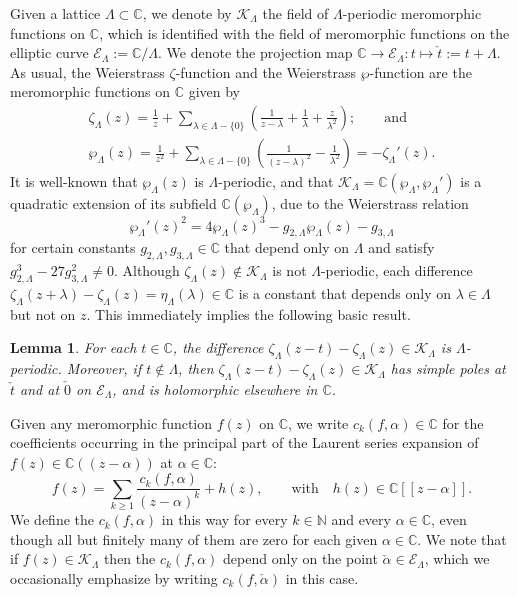\documentclass[preprint,12pt]{elsarticle}
\numberwithin{equation}{section} %
\theoremstyle{theorem}
\newtheorem{lemma}[theorem]{Lemma}
\theoremstyle{definition}
\newcommand{\bk}{\mathcal{K}} %
\newcommand{\bkl}{\bk_{\Lambda}} %
\newcommand{\ec}{\mathcal{E}} %
\newcommand{\ecl}{\ec_{\Lambda}} %
\newcommand{\C}{\mathbb{C}} %
\newcommand{\wpl}{\wp_{\Lambda}}
\newcommand{\zl}{\zeta_{\Lambda}}
\begin{document}
Given a lattice $\Lambda\subset \C$, we denote by $\bkl$ the field of $\Lambda$-periodic meromorphic functions on $\C$, which is identified with the field of meromorphic functions on the elliptic curve $\ecl:=\mathbb{C}/\Lambda$. We denote the projection map $\C\rightarrow\ecl:t\mapsto \check{t}:=t+\Lambda$. As usual, the Weierstrass $\zeta$-function and the Weierstrass $\wp$-function are the meromorphic functions on $\C$ given by
\begin{equation}\label{eq:zeta-wp-defs}
\begin{gathered}
\zl(z)=\frac{1}{z}+\sum_{\lambda\in\Lambda-\{0\}}\left(\frac{1}{z-\lambda}+\frac{1}{\lambda}+\frac{z}{\lambda^2}\right);\qquad\text{and}\\ 
\wpl(z)=\frac{1}{z^2}+\sum_{\lambda\in\Lambda-\{0\}} \left(\frac{1}{(z-\lambda)^2}-\frac{1}{\lambda^2}\right)=-\zl'(z).
\end{gathered} \end{equation}
It is well-known that $\wpl(z)$ is $\Lambda$-periodic, and that $\bkl=\C(\wpl,\wpl')$ is a quadratic extension of its subfield $\C(\wpl)$, due to the Weierstrass relation \begin{equation}\label{eq:weierstrass-de} \wpl'(z)^2=4\wpl(z)^3-g_{2,\Lambda}\wpl(z)-g_{3,\Lambda}\end{equation} for certain constants $g_{2,\Lambda},g_{3,\Lambda}\in\C$ that depend only on $\Lambda$ and satisfy $g_{2,\Lambda}^3-27g_{3,\Lambda}^2\neq 0$. Although \mbox{$\zl(z)\notin \bkl$} is not $\Lambda$-periodic, each difference \mbox{$\zl(z+\lambda)-\zl(z)=\eta_\Lambda(\lambda)\in\C$} is a constant that depends only on $\lambda\in\Lambda$ but not on $z$. This immediately implies the following basic result.
\begin{lemma}\label{lem:l-zeta-difference}
    For each $t\in\C$, the difference $\zl(z-t)-\zl(z)\in\bkl$ is \mbox{$\Lambda$-periodic}. Moreover, if $t\notin\Lambda$, then $\zl(z-t)-\zl(z)\in\bkl$ has simple poles at $\check{t}$ and at $\check{0}$ on $\ecl$, and is holomorphic elsewhere in $\C$.
\end{lemma}

Given any meromorphic function $f(z)$ on $\C$, we write $c_k(f,\alpha)\in\C$ for the coefficients occurring in the principal part of the Laurent series expansion of $f(z)\in\C((z-\alpha))$ at $\alpha\in\C$: \begin{equation}\label{eq:laurent-coeffs-l}f(z)=\sum_{k\geq 1}\frac{c_k(f,\alpha)}{(z-\alpha)^k}+h(z), \qquad\text{with} \quad h(z)\in\C[[z-\alpha]].\end{equation} We define the $c_k(f,\alpha)$ in this way for every $k\in\mathbb{N}$ and every $\alpha\in\C$, even though all but finitely many of them are zero for each given $\alpha\in\C$. We note that if $f(z)\in\bkl$ then the $c_k(f,\alpha)$ depend only on the point $\check{\alpha}\in\ecl$, which we occasionally emphasize by writing $c_k(f,\check{\alpha})$ in this case.
\end{document}
